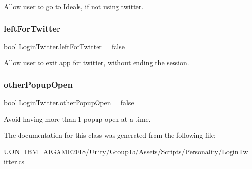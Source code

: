 Allow user to go to \mbox{\hyperlink{class_ideals}{Ideals}}, if not using twitter. 

\mbox{\label{class_login_twitter_a6719de883466089832df2f9f5189629e}} 
\subsubsection{\texorpdfstring{leftForTwitter}{leftForTwitter}}
{\footnotesize\ttfamily bool Login\+Twitter.\+left\+For\+Twitter = false\hspace{0.3cm}{\ttfamily [static]}}



Allow user to exit app for twitter, without ending the session. 

\mbox{\label{class_login_twitter_af567aa064be62c7c71fdd375d5f46b10}} 
\subsubsection{\texorpdfstring{otherPopupOpen}{otherPopupOpen}}
{\footnotesize\ttfamily bool Login\+Twitter.\+other\+Popup\+Open = false\hspace{0.3cm}{\ttfamily [private]}}



Avoid having more than 1 popup open at a time. 



The documentation for this class was generated from the following file\+:\begin{DoxyCompactItemize}
\item 
U\+O\+N\+\_\+\+I\+B\+M\+\_\+\+A\+I\+G\+A\+M\+E2018/\+Unity/\+Group15/\+Assets/\+Scripts/\+Personality/\mbox{\hyperlink{_login_twitter_8cs}{Login\+Twitter.\+cs}}\end{DoxyCompactItemize}
